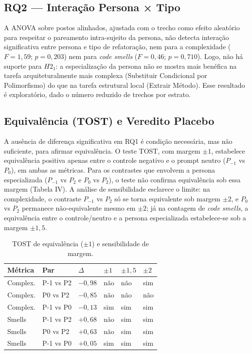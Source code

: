 \documentclass[10pt,conference,a4paper,twocolumn]{article}
\begin{document}
\subsection{RQ2 --- Interação Persona × Tipo}
A ANOVA sobre postos alinhados, ajustada com o trecho como efeito aleatório para respeitar o pareamento intra-sujeito da persona, não detecta interação significativa entre persona e tipo de refatoração, nem para a complexidade ($F = 1{,}59$; $p = 0{,}203$) nem para \textit{code smells} ($F = 0{,}46$; $p = 0{,}710$). Logo, não há suporte para $H2_1$: a especialização da persona não se mostra mais benéfica na tarefa arquiteturalmente mais complexa (Substituir Condicional por Polimorfismo) do que na tarefa estrutural local (Extrair Método). Esse resultado é exploratório, dado o número reduzido de trechos por estrato.

\subsection{Equivalência (TOST) e Veredito Placebo}
A ausência de diferença significativa em RQ1 é condição necessária, mas não suficiente, para afirmar equivalência. O teste TOST, com margem $\pm 1$, estabelece equivalência positiva apenas entre o controle negativo e o prompt neutro ($P_{-1}$ vs $P_0$), em ambas as métricas. Para os contrastes que envolvem a persona especializada ($P_{-1}$ vs $P_2$ e $P_0$ vs $P_2$), o teste não confirma equivalência sob essa margem (Tabela IV). A análise de sensibilidade esclarece o limite: na complexidade, o contraste $P_{-1}$ vs $P_2$ só se torna equivalente sob margem $\pm 2$, e $P_0$ vs $P_2$ permanece não-equivalente mesmo em $\pm 2$; já na contagem de \textit{code smells}, a equivalência entre o controle/neutro e a persona especializada estabelece-se sob a margem $\pm 1{,}5$.

\begin{table}[htbp]
\centering
\caption{TOST de equivalência ($\pm 1$) e sensibilidade de margem.}
\label{tab:tost}
\footnotesize
\setlength{\tabcolsep}{3pt}
\renewcommand{\arraystretch}{1.2}
\begin{tabularx}{\columnwidth}{|>{\raggedright\arraybackslash}p{}|>{\centering\arraybackslash}X|>{\centering\arraybackslash}p{}|>{\centering\arraybackslash}X|>{\centering\arraybackslash}X|>{\centering\arraybackslash}X|}
\hline
\textbf{Métrica} & \textbf{Par} & \textbf{$\Delta$} & \textbf{$\pm 1$} & \textbf{$\pm 1{,}5$} & \textbf{$\pm 2$} \\
\hline
Complex. & P-1 vs P2 & $-0{,}98$ & não & não & sim \\
\hline
Complex. & P0 vs P2 & $-0{,}85$ & não & não & não \\
\hline
Complex. & P-1 vs P0 & $-0{,}13$ & sim & sim & sim \\
\hline
Smells & P-1 vs P2 & $+0{,}68$ & não & sim & sim \\
\hline
Smells & P0 vs P2 & $+0{,}63$ & não & sim & sim \\
\hline
Smells & P-1 vs P0 & $+0{,}05$ & sim & sim & sim \\
\hline
\end{tabularx}
\end{table}
\end{document}
